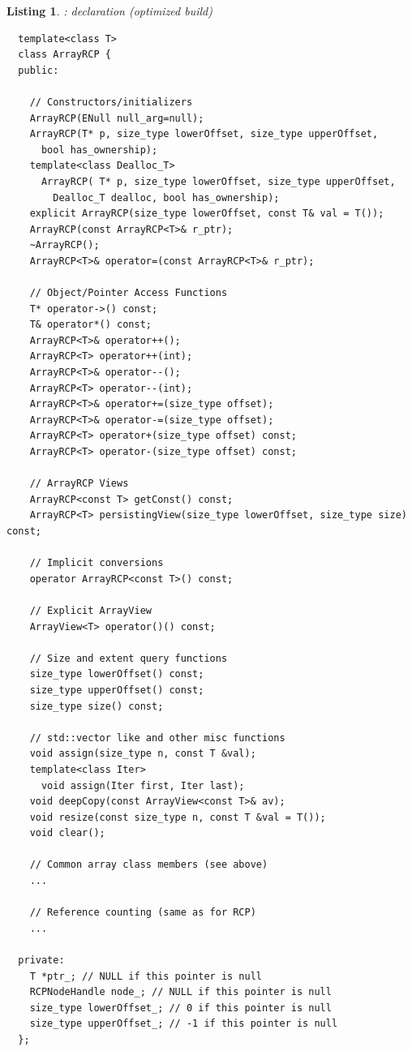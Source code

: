 \documentclass[pdf,ps2pdf,11pt]{SANDreport}
\newtheorem{listing}{Listing}
\begin{document}
\begin{listing}: {} declaration (optimized build)\\
\label{listing:ArrayRCP}
{\small\begin{verbatim}
  template<class T>
  class ArrayRCP {
  public:
  
    // Constructors/initializers
    ArrayRCP(ENull null_arg=null);
    ArrayRCP(T* p, size_type lowerOffset, size_type upperOffset,
      bool has_ownership);
    template<class Dealloc_T>
      ArrayRCP( T* p, size_type lowerOffset, size_type upperOffset,
        Dealloc_T dealloc, bool has_ownership);
    explicit ArrayRCP(size_type lowerOffset, const T& val = T());
    ArrayRCP(const ArrayRCP<T>& r_ptr);
    ~ArrayRCP();
    ArrayRCP<T>& operator=(const ArrayRCP<T>& r_ptr);

    // Object/Pointer Access Functions 
    T* operator->() const;
    T& operator*() const;
    ArrayRCP<T>& operator++();
    ArrayRCP<T> operator++(int);
    ArrayRCP<T>& operator--();
    ArrayRCP<T> operator--(int);
    ArrayRCP<T>& operator+=(size_type offset);
    ArrayRCP<T>& operator-=(size_type offset);
    ArrayRCP<T> operator+(size_type offset) const;
    ArrayRCP<T> operator-(size_type offset) const;
  
    // ArrayRCP Views
    ArrayRCP<const T> getConst() const;
    ArrayRCP<T> persistingView(size_type lowerOffset, size_type size) const;
  
    // Implicit conversions
    operator ArrayRCP<const T>() const;

    // Explicit ArrayView
    ArrayView<T> operator()() const;
  
    // Size and extent query functions 
    size_type lowerOffset() const;
    size_type upperOffset() const;
    size_type size() const;
  
    // std::vector like and other misc functions
    void assign(size_type n, const T &val);
    template<class Iter>
      void assign(Iter first, Iter last);
    void deepCopy(const ArrayView<const T>& av);
    void resize(const size_type n, const T &val = T());
    void clear();

    // Common array class members (see above)
    ...
  
    // Reference counting (same as for RCP)
    ...
  
  private:
    T *ptr_; // NULL if this pointer is null
    RCPNodeHandle node_; // NULL if this pointer is null
    size_type lowerOffset_; // 0 if this pointer is null
    size_type upperOffset_; // -1 if this pointer is null
  };
  

\end{verbatim}}
\end{listing}
\end{document}
